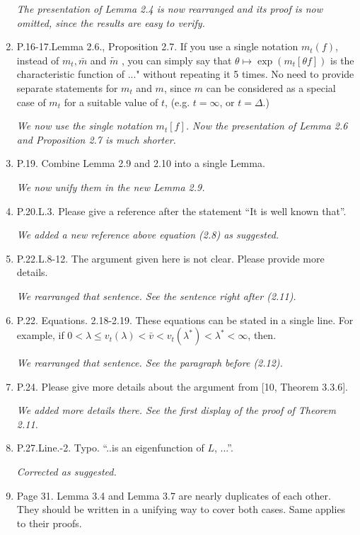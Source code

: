 \documentclass[12pt,a4paper]{amsart}
\begin{document}
\begin{enumerate}
  \emph{The presentation of Lemma 2.4 is now rearranged and its proof is now omitted, since the results are easy to verify.}
\item
  P.16-17.Lemma 2.6., Proposition 2.7.
  If you use a single notation $m_t(f)$, instead of $m_t, \bar m$ and $\tilde m$ , you can simply say that $\theta \mapsto \exp(m_t[\theta f])$ is the characteristic function of ..." without repeating it 5 times.
  No need to provide separate statements for $m_t$ and $m$, since $m$ can be considered as a special case of $m_t$ for a suitable value of $t$, (e.g. $t = \infty$, or $t = \Delta$.)

  \emph{We now use the single notation $m_t[f]$. Now the presentation of Lemma 2.6 and Proposition 2.7 is much shorter.}
\item
  P.19.
  Combine Lemma 2.9 and 2.10 into a single Lemma.

  \emph{We now unify them in the new Lemma 2.9.}
\item
  P.20.L.3.
  Please give a reference after the statement ``It is well known that''.

  \emph{We added a new reference above equation (2.8) as suggested.}
\item
  P.22.L.8-12.
  The argument given here is not clear.
  Please provide more details.

  \emph{We rearranged that sentence. See the sentence right after (2.11).}
\item
  P.22. Equations. 2.18-2.19.
  These equations can be stated in a single line.
  For example, if $0< \lambda \leq v_t(\lambda) < \bar v < v_t(\lambda^*)<\lambda^* < \infty$, then.

  \emph{We rearranged that sentence. 
See the paragraph before (2.12).}

\item
  P.24.
  Please give more details about the argument from [10, Theorem 3.3.6].

  \emph{We added more details there. 
    See the first display of the proof of Theorem 2.11.}

\item
  P.27.Line.-2.
  Typo. ``..is an eigenfunction of $L$, ...''.

  \emph{Corrected as suggested.}
\item
  Page 31. Lemma 3.4 and Lemma 3.7 are nearly duplicates of each other.
  They should be written in a unifying way to cover both cases. Same applies to their proofs.


\end{enumerate}
\end{document}
